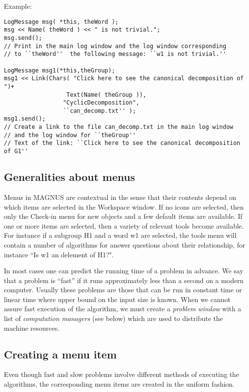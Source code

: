 \documentclass[12pt]{article}
\def\magnus{MAGNUS }
\begin{document}
Example:

\footnotesize
\begin{verbatim}
LogMessage msg( *this, theWord );
msg << Name( theWord ) << " is not trivial.";
msg.send();
// Print in the main log window and the log window corresponding
// to ``theWord''  the following message: ``w1 is not trivial.''

LogMessage msg1(*this,theGroup);
msg1 << Link(Chars( "Click here to see the canonical decomposition of ")+
                  Text(Name( theGroup )),
                 "CyclicDecomposition",
                 ``can_decomp.txt'' );
msg1.send();
// Create a link to the file can_decomp.txt in the main log window
// and the log window for ``theGroup''
// Text of the link: ``Click here to see the canonical decomposition of G1''

\end{verbatim}
\normalsize

\subsection{Generalities about menus} Menus in \magnus are contextual
in the sense that their contents depend on which items are selected
in the Workspace window.  If no icons are selected, then only the Check-in
menu for new objects and a few default items are available. If one or more
items are selected, then a variety of relevant tools become available.
For instance if a subgroup H1 and a word w1 are selected, the tools menu
will contain a number of algorithms for answer questions about their
relationship, for instance ``Is w1 an delement of H1?".


In most cases one can predict the running time of a problem in advance.
We say that a problem is ``fast''  if it runs approximately less than a
second on a modern computer. Usually these problems are those that
can be run in constant time or linear time where upper bound on the
input size is known. When we cannot assure fast execution of the algorithm,
we must create a {\em problem window} with a list of {\em
computation managers} (see below) which are used to distribute
the machine resources.


\subsection{Creating a menu item}
Even though  fast and slow problems  involve different methods of
executing the algorithms, the corresponding menu items are created in the
uniform fashion.
\end{document}
